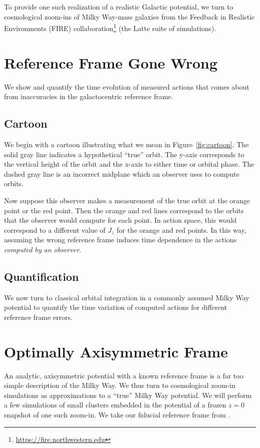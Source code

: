 \documentclass[twocolumn]{aastex62}
\newcommand{\z}{z}
\begin{document}
To provide one such realization of a realistic Galactic potential, we turn to
cosmological zoom-ins of Milky Way-mass galaxies from the Feedback in
Realistic Environments (FIRE)
collaboration\footnote{\url{https://fire.northwestern.edu}} (the Latte suite
of simulations).

\section{Reference Frame Gone Wrong} \label{sec:ref_frame}
We show and quantify the time evolution of measured actions that comes about
from inaccuracies in the galactocentric reference frame.

\subsection{Cartoon} \label{ssec:cartoon}
We begin with a cartoon illustrating what we mean in Figure~\ref{fig:cartoon}.
The solid gray line indicates a hypothetical ``true'' orbit. The y-axis
corresponds to the vertical height of the orbit and the x-axis to either time
or orbital phase. The dashed gray line is an incorrect midplane which an
observer uses to compute orbits.

Now suppose this observer makes a measurement of the true orbit at the orange
point or the red point. Then the orange and red lines correspond to the orbits
that the observer would compute for each point. In action space, this would
correspond to a different value of $J_z$ for the orange and red points. In
this way, assuming the wrong reference frame induces time dependence in the
actions {\em computed by an observer}.

\begin{figure*}
\caption{Caption.}
\label{fig:cartoon}
\end{figure*}

\subsection{Quantification} \label{ssec:quant}
We now turn to classical orbital integration in a commonly assumed Milky Way
potential to quantify the time variation of computed actions for different
reference frame errors. 



\section{Optimally Axisymmetric Frame} \label{sec:oa_frame}
An analytic, axisymmetric potential with a known reference frame is a far too
simple description of the Milky Way. We thus turn to cosmological zoom-in
simulations as approximations to a ``true'' Milky Way potential. We will
perform a few simulations of small clusters embedded in the potential of a
frozen $\z=0$ snapshot of one such zoom-in. We take our fiducial reference
frame from \citet{2018arXiv180610564S}.
\end{document}
